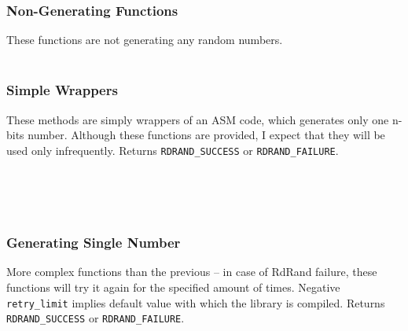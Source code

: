 \subsubsection{Non-Generating Functions}

These functions are not generating any random numbers.\\

\\

\subsubsection{Simple Wrappers}\label{subsec:api:simple-wrappers}
\par{
These methods are simply wrappers of an ASM code, which generates only one n-bits number. Although these functions are provided, I expect that they will be used only infrequently. Returns {\tt RDRAND\_SUCCESS} or {\tt RDRAND\_FAILURE}.\\
}

\\

\\

\\

\subsubsection{Generating Single Number}\label{subsec:api:single-number}
\par{
More complex functions than the previous -- in case of RdRand failure, these functions will try it again for the specified amount of times. Negative {\tt retry\_limit} implies default value with which the library is compiled. Returns {\tt RDRAND\_SUCCESS} or {\tt RDRAND\_FAILURE}.\\
}

\\

